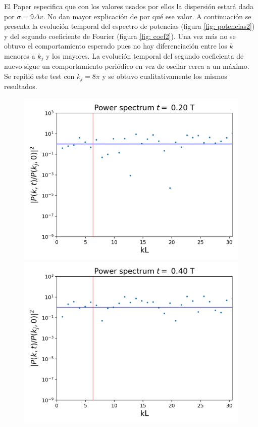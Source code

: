 \documentclass[notitlepage,letterpaper,12pt]{article} %
\begin{document}
El Paper especifica que con los valores usados por ellos la dispersión estará dada por $\sigma = 9\Delta v$. No dan mayor explicación de por qué ese valor. A continuación se presenta la evolución temporal del espectro de potencias (figura \ref{fig: potencias2}) y del segundo coeficiente de Fourier (figura \ref{fig: coef2}).
Una vez más no se obtuvo el comportamiento esperado pues no hay diferenciación entre los $k$ menores a $k_j$ y los mayores.
La evolución temporal del segundo coeficienta de nuevo sigue un comportamiento periódico en vez de oscilar cerca a un máximo.
Se repitió este test con $k_j = 8\pi$ y se obtuvo cualitativamente los mismos resultados.


\begin{figure}[H]
  \centering
   \includegraphics[scale= 0.5]{2powerSeries8.png}
   \includegraphics[scale= 0.5]{2powerSeries16.png}

\end{figure}
\end{document}

